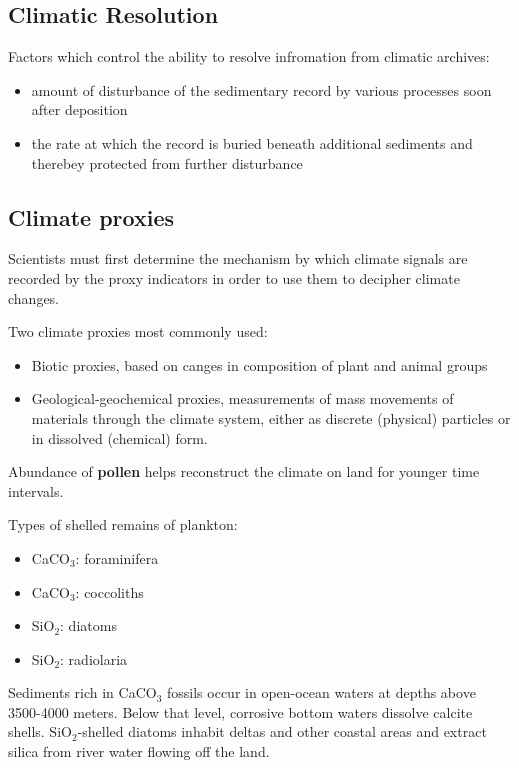 \subsection{Climatic Resolution}

Factors which control the ability to resolve infromation from climatic
archives:
\begin{itemize}
	\item amount of disturbance of the sedimentary record by various
	processes soon after deposition
	\item the rate at which the record is buried beneath additional
	sediments and therebey protected from further disturbance
\end{itemize}

\subsection{Climate proxies}

Scientists must first determine the mechanism by which climate signals are
recorded by the proxy indicators in order to use them to decipher climate
changes.

Two climate proxies most commonly used:
\begin{itemize}
	\item Biotic proxies, based on canges in composition of plant and
	animal groups
	\item Geological-geochemical proxies, measurements of mass movements
	of materials through the climate system, either as discrete (physical)
	particles or in dissolved (chemical) form.
\end{itemize}

Abundance of \textbf{pollen} helps reconstruct the climate on land for younger
time intervals.

Types of shelled remains of plankton:

\begin{itemize}
	\item CaCO$_3$: foraminifera
	\item CaCO$_3$: coccoliths
	\item SiO$_2$: diatoms
	\item SiO$_2$: radiolaria
\end{itemize}

Sediments rich in CaCO$_3$ fossils occur in open-ocean waters at depths above
3500-4000 meters. Below that level, corrosive bottom waters dissolve calcite
shells. SiO$_2$-shelled diatoms inhabit deltas and other coastal areas and
extract silica from river water flowing off the land.


